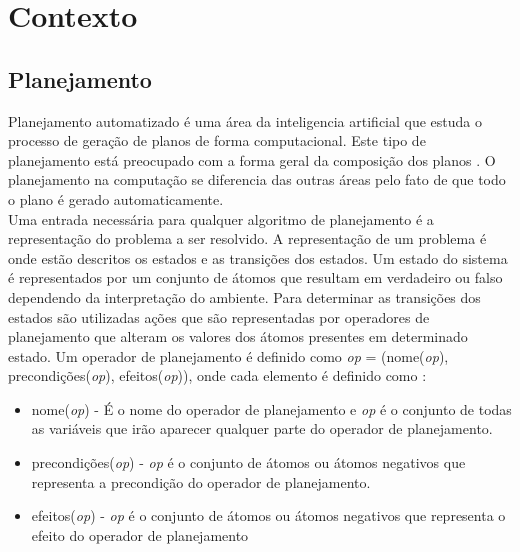 \chapter{\label{chap:conte}Contexto}



\section{Planejamento} 

Planejamento automatizado é uma área da inteligencia artificial que estuda o processo de geração de planos de forma computacional. Este tipo de planejamento está preocupado com a forma geral da composição dos planos \cite{ghallab2004automated}. O planejamento na computação se diferencia das outras áreas pelo fato de que todo o plano é gerado automaticamente. \\


Uma entrada necessária para qualquer algoritmo de planejamento é a representação do problema a ser resolvido. A representação de um problema é onde estão descritos os estados e as transições dos estados. Um estado do sistema é representados por um conjunto de átomos que resultam em verdadeiro ou falso dependendo da interpretação do ambiente. Para determinar as transições dos estados são utilizadas ações que são  representadas por operadores de planejamento que alteram os valores dos átomos presentes em determinado estado. Um operador de planejamento é definido como \textit{op} = (nome(\textit{op}), precondições(\textit{op}), efeitos(\textit{op})), onde cada elemento é definido como \cite{ghallab2004automated}: 
\begin{itemize}
	\item nome(\textit{op}) - É o nome do operador de planejamento e \textit{op} é o conjunto de todas as variáveis que irão aparecer qualquer parte do operador de planejamento.  
	\item precondições(\textit{op}) - \textit{op} é o conjunto de átomos ou átomos negativos que representa a precondição do operador de planejamento. 
	\item efeitos(\textit{op}) - \textit{op} é o conjunto de átomos ou átomos negativos que representa o efeito do operador de planejamento
\end{itemize}

